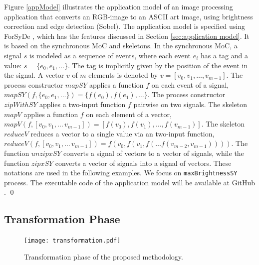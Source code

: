\begin{exmp}\label{ex:appModel}
Figure \ref{appModel} illustrates the application model of an image processing application that converts an RGB-image to an ASCII art image, using brightness correction and edge detection (Sobel).
The application model is specified using ForSyDe \cite{sander2004system}, which has the features discussed in Section \ref{sec:application model}. It is based on the synchronous MoC and skeletons. 
In the synchronous MoC, a signal $s$ is modeled as a sequence of events, where each event $e_i$ has a tag and a value: $s = \{e_0, e_1, \dots\}$. The tag is implicitly given by the position of the event in the signal. A vector $v$ of $m$ elements is denoted by $v = [v_0, v_1, \dots, v_{m-1}]$. The process constructor $\mathit{mapSY}$ applies a function $f$ on each event of a signal, $\mathit{mapSY} (f, \{e_0, e_1, \dots\}) =  \{f(e_0), f(e_1), \dots\}$. The process constructor $\mathit{zipWithSY}$ applies a two-input function $f$ pairwise on two signals. The skeleton $\mathit{mapV}$ applies a function $f$ on each element of a vector,  $\mathit{mapV} (f, [v_0, v_1, \dots\, v_{m-1}]) =  [f(v_0), f(v_1), \dots, f (v_{m-1})]$. The skeleton $\mathit{reduceV}$ reduces a vector to a single value via an two-input function, $\mathit{reduceV} (f, [v_0, v_1, \dots\, v_{m-1}]) = f(v_0, f(v_1, f(\dots f(v_{m-2}, v_{m-1}))))$. The function $\mathit{unzipxSY}$ converts a signal of vectors to a vector of signals, while the function $\mathit{zipxSY}$ converts a vector of signals into a signal of vectors. These notations are used in the following examples.
We focus on \texttt{maxBrightnessSY} process. The executable code of the application model will be available at GitHub \cite{omitted}. 
\qed
\end{exmp}

\subsection{Transformation Phase}
\begin{figure}[t]
	\centering
	\texttt{[image: transformation.pdf]}
	\caption{Transformation phase of the proposed methodology.}
	\label{transformation}
\end{figure}

